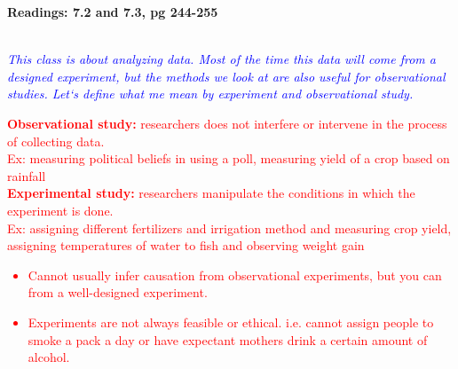 \begin{center}\large\textbf{Readings: 7.2 and 7.3, pg 244-255}\\
\normalsize \end{center}
\large ~\hrulefill
~\\
\normalsize\textit{\textcolor{blue}{This class is about analyzing data.  Most of the time this data will come from a designed experiment, but the methods we look at are also useful for observational studies.  Let`s define what me mean by experiment and observational study.}}\\

\textcolor{red}{\textbf{Observational study: } researchers does not interfere or intervene in the process of collecting data. \\
\indent Ex: measuring political beliefs in using a poll, measuring yield of a crop based on rainfall\\
\textbf{Experimental study: } researchers manipulate the conditions in which the experiment is done. \\
\indent	Ex: assigning different fertilizers and irrigation method and measuring crop yield, assigning 	temperatures of water to fish and observing weight gain\\
\begin{itemize}
\item Cannot usually infer causation from observational experiments, but you can from a well-designed experiment.
\item Experiments are not always feasible or ethical.  i.e. cannot assign people to smoke a pack a day or have expectant mothers drink a certain amount of alcohol.
\end{itemize}}

